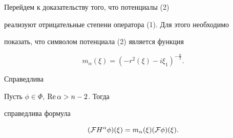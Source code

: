 Перейдем к доказательству того, что потенциалы (2)


реализуют отрицательные степени оператора (1). Для этого необходимо


показать, что символом потенциала (2) является функция


$$


m_\alpha(\xi)=(-r^2(\xi)-i\xi_1)^{-\frac{\alpha}{2}}.


$$


Справедлива








\begin{thm} Пусть $\phi\in\Phi$, $\operatorname{Re}\alpha>n-2$. Тогда


справедлива формула


\begin{equation}


(\F H^\alpha\phi)(\xi)=m_\alpha(\xi)(\F\phi)(\xi).


\end{equation}


\end{thm}





